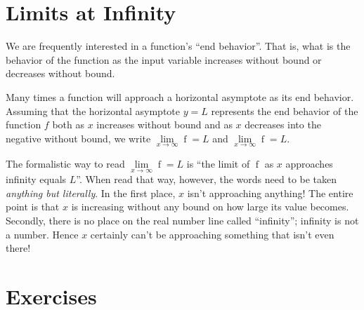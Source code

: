 \documentclass[12pt,]{book}
\theoremstyle{plain}
\theoremstyle{definition}
\numberwithin{equation}{section}
\newcommand{\fe}[2]{\mathop{{#1}{\left(#2\right)}}}
\begin{document}
\section[Limits at Infinity]{Limits at Infinity}\label{section-limits-at-infinity}
We are frequently interested in a function's ``end behavior''. That is, what is the behavior of the function as the input variable increases without bound or decreases without bound.%
\par
Many times a function will approach a horizontal asymptote as its end behavior. Assuming that the horizontal asymptote \(y=L\) represents the end behavior of the function \(f\) both as \(x\) increases without bound and as \(x\) decreases into the negative without bound, we write \(\lim\limits_{x\to\infty}\fe{f}{x}=L\) and \(\lim\limits_{x\to\infty}\fe{f}{x}=L\).%
\par
The formalistic way to read \(\lim\limits_{x\to\infty}\fe{f}{x}=L\) is ``the limit of \(\fe{f}{x}\) as \(x\) approaches infinity equals \(L\)''. When read that way, however, the words need to be taken \emph{anything but literally}. In the first place, \(x\) isn't approaching anything! The entire point is that \(x\) is increasing without any bound on how large its value becomes. Secondly, there is no place on the real number line called ``infinity''; infinity is not a number. Hence \(x\) certainly can't be approaching something that isn’t even there!%
\typeout{************************************************}
\typeout{************************************************}
\section*{Exercises}\label{exercises-8}
\end{document}
